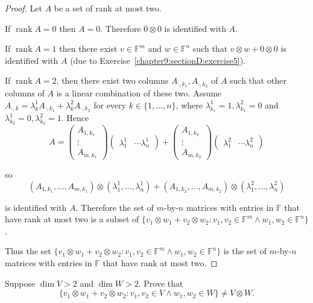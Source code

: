 \begin{proof}
    Let $A$ be a set of rank at most two.

    If $\operatorname{rank}A = 0$ then $A = 0$. Therefore $0\otimes 0$ is identified with $A$.

    If $\operatorname{rank}A = 1$ then there exist $v\in\mathbb{F}^{m}$ and $w\in\mathbb{F}^{n}$ such that $v\otimes w + 0\otimes 0$ is identified with $A$ (due to Exercise~\ref{chapter9:sectionD:exercise5}).

    If $\operatorname{rank}A = 2$, then there exist two columns $A_{\cdot,k_{1}}, A_{\cdot,k_{2}}$ of $A$ such that other columns of $A$ is a linear combination of these two. Assume $A_{\cdot,k} = \lambda_{k}^{1}A_{\cdot,k_{1}} + \lambda_{k}^{2}A_{\cdot,k_{2}}$ for every $k\in\{1,\ldots,n\}$, where $\lambda_{k_{1}}^{1} = 1, \lambda_{k_{1}}^{2} = 0$ and $\lambda_{k_{2}}^{1} = 0, \lambda_{k_{2}}^{2} = 1$. Hence
    \[
        A = \begin{pmatrix}A_{1,k_{1}} \\ \vdots \\ A_{m,k_{1}}\end{pmatrix}\begin{pmatrix}\lambda_{1}^{1} & \cdots \lambda_{n}^{1}\end{pmatrix} + \begin{pmatrix}A_{1,k_{2}} \\ \vdots \\ A_{m,k_{2}}\end{pmatrix}\begin{pmatrix}\lambda_{1}^{2} & \cdots \lambda_{n}^{2}\end{pmatrix}
    \]

    so
    \[
        (A_{1,k_{1}}, \ldots, A_{m,k_{1}})\otimes (\lambda_{1}^{1}, \ldots, \lambda_{n}^{1}) + (A_{1,k_{2}}, \ldots, A_{m,k_{2}})\otimes (\lambda_{1}^{2}, \ldots, \lambda_{n}^{2})
    \]

    is identified with $A$. Therefore the set of $m$-by-$n$ matrices with entries in $\mathbb{F}$ that have rank at most two is a subset of $\{ v_{1}\otimes w_{1} + v_{2}\otimes w_{2}: v_{1}, v_{2}\in \mathbb{F}^{m}\land w_{1}, w_{2}\in \mathbb{F}^{n} \}$.

    Thus the set $\{ v_{1}\otimes w_{1} + v_{2}\otimes w_{2}: v_{1}, v_{2}\in\mathbb{F}^{m}\land w_{1}, w_{2}\in\mathbb{F}^{n} \}$ is the set of $m$-by-$n$ matrices with entries in $\mathbb{F}$ that have rank at most two.
\end{proof}
\newpage

\begin{exercise}\label{chapter9:sectionD:exercise7}
    Suppose $\dim V > 2$ and $\dim W > 2$. Prove that
    \[
        \{ v_{1}\otimes w_{1} + v_{2}\otimes w_{2}: v_{1}, v_{2}\in V \land w_{1}, w_{2}\in W \}\ne V\otimes W.
    \]
\end{exercise}

